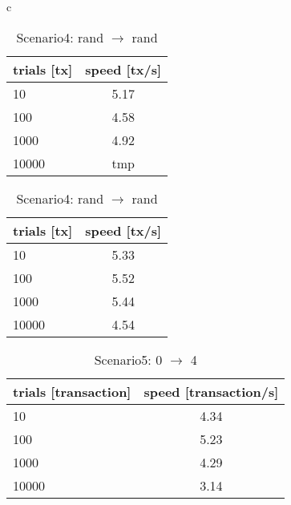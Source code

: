 \documentclass[a4j,11pt,uplatex,onecolumn]{article}
\begin{document}
\begin{table}[htbp]
    \begin{center}
        \begin{tabular}{c}

            \begin{minipage}{0.5\hsize}
                \begin{center}
                    \caption{Scenario3: 0 $\rightleftarrows$ 1, 2 $\rightleftarrows$ 3}
                    \begin{tabular}{|l|c|} \hline
                        trials [tx] & speed [tx/s]\\ \hline \hline
                        10 & 5.17 \\
                        100 & 4.58 \\
                        1000 & 4.92 \\
                        10000 & tmp \\ \hline
                    \end{tabular}
                \end{center}
            \end{minipage}

            \begin{minipage}{0.5\hsize}
                \begin{center}
                    \caption{Scenario4: rand $\rightarrow$ rand}
                    \begin{tabular}{|l|c|} \hline
                        trials [tx] & speed [tx/s]\\ \hline \hline
                        10 & 5.33 \\
                        100 & 5.52 \\
                        1000 & 5.44 \\
                        10000 & 4.54 \\ \hline
                    \end{tabular}
                \end{center}
            \end{minipage}

        \end{tabular}
    \end{center}
\end{table}

\begin{table}[htb]
  \begin{center}
    \caption{Scenario5: 0 $\rightarrow$ 4}
    \begin{tabular}{|l|c|} \hline
        trials [transaction] & speed [transaction/s]\\ \hline \hline
        10 & 4.34 \\
        100 & 5.23 \\
        1000 & 4.29 \\
        10000 & 3.14 \\ \hline
    \end{tabular}
  \end{center}
\end{table}
\end{document}
